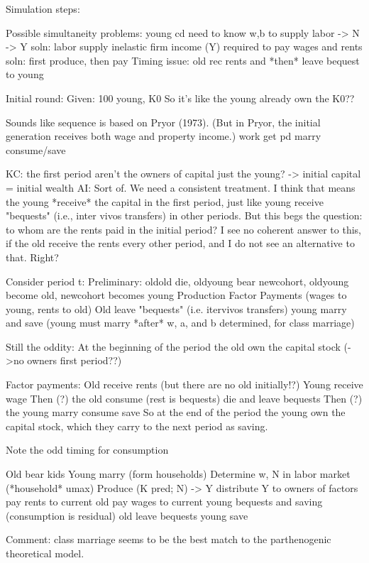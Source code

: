 \documentclass{article}
\begin{document}
Simulation steps:
\begin{verbatimtab}
Possible simultaneity problems:
        young cd need to know w,b to supply labor -> N -> Y
                soln: labor supply inelastic
        firm income (Y) required to pay wages and rents
                soln: first produce, then pay
Timing issue:
        old rec rents and *then* leave bequest to young

Initial round:
        Given: 100 young, K0
        So it's like the young already own the K0??

Sounds like sequence is based on Pryor (1973).
(But in Pryor, the initial generation receives both wage and property income.)
        work
        get pd
        marry
        consume/save

KC: the first period aren't the owners of capital just the young? -> initial capital = initial wealth
AI: Sort of.  We need a consistent treatment.  I think that means the young *receive* the capital
    in the first period, just like young receive "bequests" (i.e., inter vivos transfers) in other
    periods.  But this begs the question: to whom are the rents paid in the initial period?
    I see no coherent answer to this, if the old receive the rents every other period,
    and I do not see an alternative to that.  Right?

Consider period t:
Preliminary: oldold die, oldyoung bear newcohort, oldyoung become old, newcohort becomes young
Production
Factor Payments (wages to young, rents to old)
Old leave "bequests" (i.e. itervivos transfers)
young marry and save (young must marry *after* w, a, and b determined, for class marriage)

Still the oddity:
At the beginning of the period the old own the capital stock (->no owners first period??)

Factor payments:
        Old receive rents (but there are no old initially!?)
        Young receive wage
Then (?) the old
        consume (rest is bequests)
        die and leave bequests
Then (?) the young
        marry
        consume
        save
So at the end of the period the young own the capital stock,
which they carry to the next period as saving.

Note the odd timing for consumption

Old bear kids
Young marry (form households)
Determine w, N in labor market (*household* umax)
Produce (K pred; N) -> Y
        distribute Y to owners of factors
                pay rents to current old
                pay wages to current young
        bequests and saving (consumption is residual)
                old leave bequests
                young save
\end{verbatimtab}
Comment: class marriage seems to be the best match to the parthenogenic theoretical model.
\end{document}
